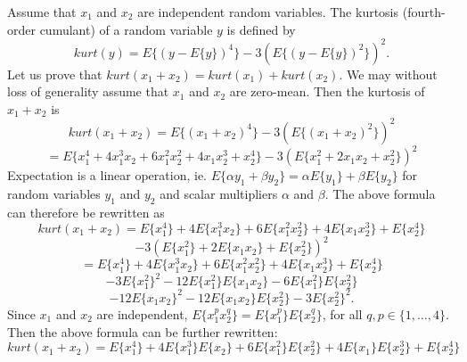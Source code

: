 \begin{enumerate}
\begin{solution}
    Assume that $x_1$ and $x_2$ are independent random variables.
    The kurtosis (fourth-order cumulant) of a random variable $y$ is defined by
    \begin{displaymath}
      kurt(y) = E\{(y-E\{y\})^4\}-3(E\{(y-E\{y\})^2\})^2 .
    \end{displaymath}
    Let us prove that $kurt(x_1+x_2)=kurt(x_1)+kurt(x_2)$.
    We may without loss of generality assume that $x_1$ and $x_2$ are zero-mean.
    Then the kurtosis of $x_1+x_2$ is
    \begin{displaymath}
      kurt(x_1+x_2)
      = E\{(x_1+x_2)^4\}-3(E\{(x_1+x_2)^2\})^2
    \end{displaymath}
    \begin{displaymath}
      = E\{x_1^4 + 4 x_1^3 x_2 + 6 x_1^2 x_2^2 + 4 x_1 x_2^3 + x_2^4\}
      -3(E\{x_1^2 + 2 x_1 x_2 + x_2^2\})^2
    \end{displaymath}
    Expectation is a linear operation,
    ie. $E\{\alpha y_1+ \beta y_2\}=\alpha E\{y_1\}+ \beta E\{y_2\}$ for random variables
    $y_1$ and $y_2$ and scalar multipliers $\alpha$ and $\beta$.
    The above formula can therefore be rewritten as
    \begin{displaymath}
      kurt(x_1+x_2)
      = E\{x_1^4\} + 4 E\{x_1^3 x_2\} + 6 E\{x_1^2 x_2^2\} + 4 E\{x_1 x_2^3\} + E\{x_2^4\}
    \end{displaymath}
    \begin{displaymath}
      -3(E\{x_1^2\} + 2 E\{x_1 x_2\} + E\{x_2^2\})^2
    \end{displaymath}
    \begin{displaymath}
      = E\{x_1^4\} + 4 E\{x_1^3 x_2\} + 6 E\{x_1^2 x_2^2\} + 4 E\{x_1 x_2^3\} + E\{x_2^4\}
    \end{displaymath}
    \begin{displaymath}
      -3 E\{x_1^2\}^2 -12 E\{x_1^2\} E\{x_1 x_2\} -6 E\{x_1^2\} E\{x_2^2\}
    \end{displaymath}
    \begin{displaymath}
      -12 E\{x_1 x_2\}^2 -12 E\{x_1 x_2\} E\{x_2^2\} -3 E\{x_2^2\}^2 .
    \end{displaymath}
    Since $x_1$ and $x_2$ are independent,
    $E\{x_1^p x_2^q\} = E\{x_1^p\} E\{x_2^q\}$, for all $q,p \in \{1,\ldots,4\}$.
    Then the above formula can be further rewritten:
    \begin{displaymath}
      kurt(x_1+x_2)
      = E\{x_1^4\} + 4 E\{x_1^3\}E\{x_2\} + 6 E\{x_1^2\}E\{x_2^2\} + 4 E\{x_1\}E\{x_2^3\}
      + E\{x_2^4\}
    \end{displaymath}

\end{solution}
\end{enumerate}
